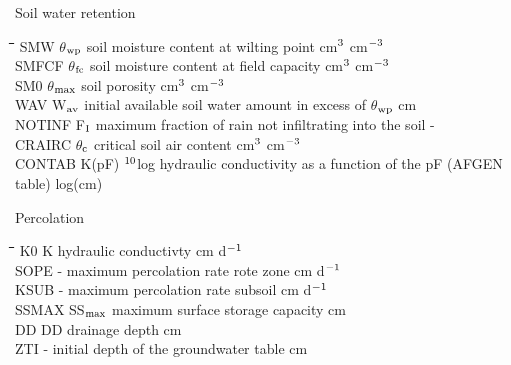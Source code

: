 \documentclass[11pt]{article}
\begin{document}
Soil water retention\nwln
\begin{tabbing}
\hspace{1.27cm}\=\hspace{1.27cm}\=\hspace{1.27cm}\=\hspace{1.27cm}\=%
\hspace{1.27cm}\=\hspace{1.27cm}\=\hspace{1.27cm}\=\hspace{1.27cm}\=%
\hspace{1.27cm}\=\hspace{1.27cm}\=\kill
SMW\> \> $\theta$$_{{\rm wp}}$\> soil moisture content at wilting point\> \> \> \> \> \> \> cm$^{{\rm 3}}$ cm$^{{\rm -3}}$\\
SMFCF\> \> $\theta$$_{{\rm fc}}$\> soil moisture content at field capacity\> \> \> \> \> \> \> cm$^{{\rm 3}}$ cm$^{{\rm -3}}$\\
SM0\> \> $\theta$$_{{\rm max}}$\> soil porosity\> \> \> \> \> \> \> cm$^{{\rm 3}}$ cm$^{{\rm -3}}$\\
WAV\> \> W$_{{\rm av}}$\> initial available soil water amount in excess of $\theta$$_{{\rm wp}}$\> \> \> \> \> \> \> cm\\
NOTINF\> \> F$_{{\rm I}}$\> maximum fraction of rain not infiltrating into the soil\> \> \> \> \> \> \> -\\
CRAIRC\> \> $\theta$$_{{\rm c}}$\> critical soil air content\> \> \> \> \> \> \> cm$^{{\rm 3}}$ cm$^{{\rm -3}}$\\
CONTAB\> \> K(pF)\> $^{{\rm 10}}$log hydraulic conductivity as a function of the pF (AFGEN table)\> \> \> \> \> \> \> log(cm)
\end{tabbing}

\bigskip
\bigskip
\bigskip
\bigskip
\bigskip
\bigskip
\bigskip
Percolation\nwln
\begin{tabbing}
\hspace{1.27cm}\=\hspace{1.27cm}\=\hspace{1.27cm}\=\hspace{1.27cm}\=%
\hspace{1.27cm}\=\hspace{1.27cm}\=\hspace{1.27cm}\=\hspace{1.27cm}\=%
\hspace{1.27cm}\=\hspace{1.27cm}\=\kill
K0\> \> K\> hydraulic conductivty\> \> \> \> \> \> \> cm d$^{{\rm -1}}$\\
SOPE\> \> -\> maximum percolation rate rote zone\> \> \> \> \> \> \> cm d$^{{\rm -1}}$\\
KSUB\> \> -\> maximum percolation rate subsoil\> \> \> \> \> \> \> cm d$^{{\rm -1}}$\\
SSMAX\> \> SS$_{{\rm max}}$\> maximum surface storage capacity\> \> \> \> \> \> \> cm\\
DD\> \> DD\> drainage depth\> \> \> \> \> \> \> cm\\
ZTI\> \> -\> initial depth of the groundwater table\> \> \> \> \> \> \> cm
\end{tabbing}
\end{document}
